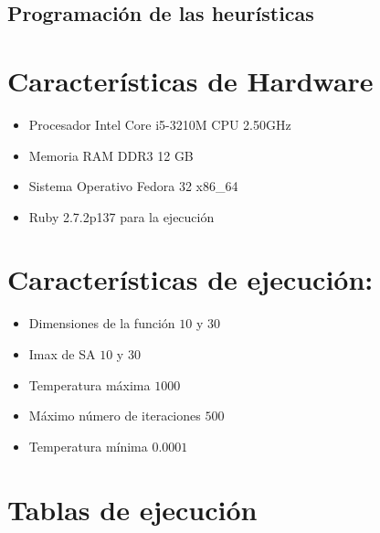 \documentclass[10pt]{article}
\begin{document}
\subsection{Programación de las heurísticas}
\begin{center}
  
\end{center}
\section{Características de Hardware}
\begin{itemize}
  \item Procesador Intel Core i5-3210M CPU 2.50GHz
  \item Memoria RAM DDR3 12 GB
  \item Sistema Operativo Fedora 32 x86\_64
  \item Ruby 2.7.2p137 para la ejecución
\end{itemize}
\section{Características de ejecución:}
\begin{itemize}
  \item Dimensiones de la función $10$ y $30$
  \item Imax de SA $10$ y $30$
  \item Temperatura máxima $1000$
  \item Máximo número de iteraciones $500$
  \item Temperatura mínima $0.0001$
\end{itemize}
\section{Tablas de ejecución}
\end{document}
